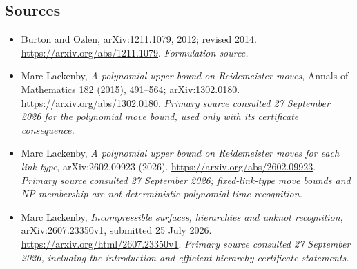 \documentclass[11pt]{article}
\begin{document}
\subsection{Sources}
\begin{itemize}
\item[S1]Burton and Ozlen, arXiv:1211.1079, 2012; revised 2014.
\url{https://arxiv.org/abs/1211.1079}.
\textit{Formulation source.}
\item[E1]Marc Lackenby, \emph{A polynomial upper bound on Reidemeister moves}, Annals of Mathematics 182 (2015), 491--564; arXiv:1302.0180.
\url{https://arxiv.org/abs/1302.0180}.
\textit{Primary source consulted 27 September 2026 for the polynomial move bound, used only with its certificate consequence.}
\item[E2]Marc Lackenby, \emph{A polynomial upper bound on Reidemeister moves for each link type}, arXiv:2602.09923 (2026).
\url{https://arxiv.org/abs/2602.09923}.
\textit{Primary source consulted 27 September 2026; fixed-link-type move bounds and NP membership are not deterministic polynomial-time recognition.}
\item[E3]Marc Lackenby, \emph{Incompressible surfaces, hierarchies and unknot recognition}, arXiv:2607.23350v1, submitted 25 July 2026.
\url{https://arxiv.org/html/2607.23350v1}.
\textit{Primary source consulted 27 September 2026, including the introduction and efficient hierarchy-certificate statements.}
\end{itemize}
\end{document}
